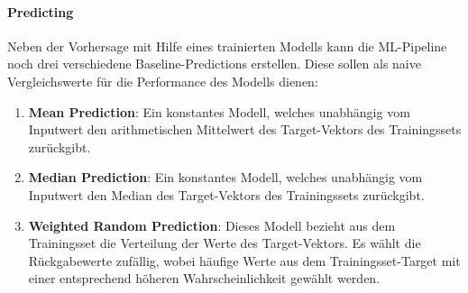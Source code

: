 \documentclass[10pt, a4paper]{article}
\begin{document}
\paragraph{Predicting} Neben der Vorhersage mit Hilfe eines trainierten Modells kann die ML-Pipeline noch drei verschiedene Baseline-Predictions erstellen. Diese sollen als naive Vergleichswerte für die Performance des Modells dienen:
\begin{enumerate}
	\item \textbf{Mean Prediction}: Ein konstantes Modell, welches unabhängig vom Inputwert den arithmetischen Mittelwert des Target-Vektors des Trainingssets zurückgibt.
	
	\item \textbf{Median Prediction}: Ein konstantes Modell, welches unabhängig vom Inputwert den Median des Target-Vektors des Trainingssets zurückgibt.
	
	\item \textbf{Weighted Random Prediction}: Dieses Modell bezieht aus dem Trainingsset die Verteilung der Werte des Target-Vektors. Es wählt die Rück\-gabe\-werte zufällig, wobei häufige Werte aus dem Trainingsset-Target mit einer entsprechend höheren Wahrscheinlichkeit gewählt werden.	
\end{enumerate}
\end{document}
